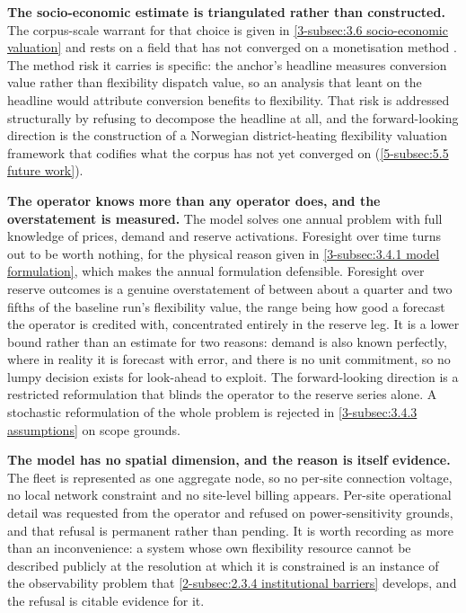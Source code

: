 \textbf{The socio-economic estimate is triangulated rather than constructed.} The corpus-scale warrant for that choice is given in \autoref{3-subsec:3.6 socio-economic valuation} and rests on a field that has not converged on a monetisation method \cite{ahmed_district_2025}. The method risk it carries is specific: the anchor's headline measures conversion value rather than flexibility dispatch value, so an analysis that leant on the headline would attribute conversion benefits to flexibility. That risk is addressed structurally by refusing to decompose the headline at all, and the forward-looking direction is the construction of a Norwegian district-heating flexibility valuation framework that codifies what the corpus has not yet converged on (\autoref{5-subsec:5.5 future work}).

\textbf{The operator knows more than any operator does, and the overstatement is measured.} The model solves one annual problem with full knowledge of prices, demand and reserve activations. Foresight over time turns out to be worth nothing, for the physical reason given in \autoref{3-subsec:3.4.1 model formulation}, which makes the annual formulation defensible. Foresight over reserve outcomes is a genuine overstatement of between about a quarter and two fifths of the baseline run's flexibility value, the range being how good a forecast the operator is credited with, concentrated entirely in the reserve leg. It is a lower bound rather than an estimate for two reasons: demand is also known perfectly, where in reality it is forecast with error, and there is no unit commitment, so no lumpy decision exists for look-ahead to exploit. The forward-looking direction is a restricted reformulation that blinds the operator to the reserve series alone. A stochastic reformulation of the whole problem is rejected in \autoref{3-subsec:3.4.3 assumptions} on scope grounds.

\textbf{The model has no spatial dimension, and the reason is itself evidence.} The fleet is represented as one aggregate node, so no per-site connection voltage, no local network constraint and no site-level billing appears. Per-site operational detail was requested from the operator and refused on power-sensitivity grounds, and that refusal is permanent rather than pending. It is worth recording as more than an inconvenience: a system whose own flexibility resource cannot be described publicly at the resolution at which it is constrained is an instance of the observability problem that \autoref{2-subsec:2.3.4 institutional barriers} develops, and the refusal is citable evidence for it.

